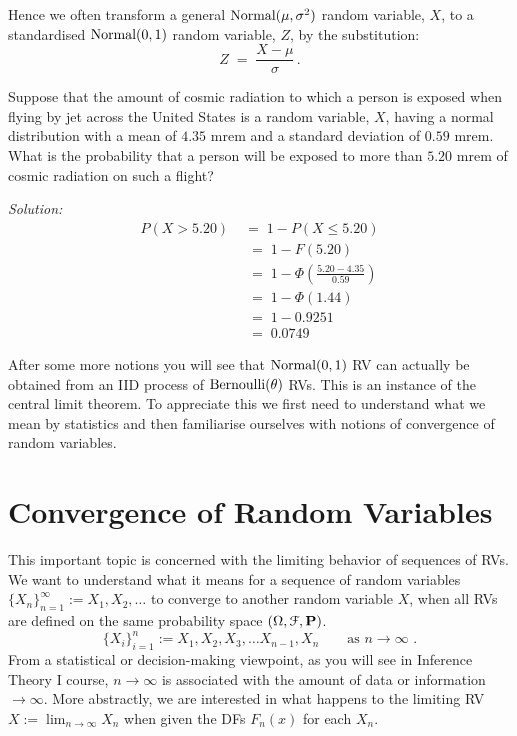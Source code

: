 Hence we often transform a general $\mbox{{\rm Normal}}(\mu,\sigma^2)$ random
variable, $X$, to a standardised $\mbox{{\rm Normal}}(0,1)$ random variable, $Z$, by
the substitution:
$$Z\;=\;\frac{X-\mu}{\sigma}\,.$$



\begin{example}
Suppose that the amount of cosmic radiation to which a person is exposed 
when flying by jet across the United States is a random
variable, $X$, having a normal distribution with a mean of $4.35$ mrem and a
standard deviation of $0.59$ mrem. What is the probability that a person
will be exposed to more than $5.20$ mrem of cosmic radiation on such a
flight?

{\em Solution:}
\begin{align*}
P(X> 5.20)\;&=\;1-P(X\leq
5.20)\\[3pt]&\;=\;1-F(5.20)\\[3pt]&\;=\;1-\Phi\left(\frac{5.20-4.35}{0.59}\right)\\[3pt]&\;=\;1-\Phi(1.44)\\[3pt]&\;=\;1-
0.9251\\[3pt]&\;=\;0.0749
\end{align*}
\end{example}

After some more notions you will see that $\mbox{{\rm Normal}}(0,1)$ RV can actually be obtained from an IID process of $\mbox{{\rm Bernoulli}}(\theta)$ RVs. This is an instance of the central limit theorem. To appreciate this we first need to understand what we mean by statistics and then familiarise ourselves with notions of convergence of random variables.

\section{Convergence of Random Variables}\label{S:ConvOfRVs}

This important topic is concerned with the limiting behavior of sequences of RVs. 
We want to understand what it means for a sequence of random variables $\{X_n\}_{n=1}^{\infty} := X_1,X_2,\ldots$ to converge to another random variable $X$, when all RVs are defined on the same probability space $(\Omega,\mathcal{F},\mathbf{P})$.
\[
\{X_i \}_{i=1}^n := X_1,X_2,X_3, \ldots X_{n-1}, X_n \qquad \text{as  $n \rightarrow \infty$ .}
\]
From a statistical or decision-making viewpoint, as you will see in Inference Theory I course, $n \rightarrow \infty$ is associated with the amount of data or information $\rightarrow \infty$.  
More abstractly, we are interested in what happens to the limiting RV $X := \lim_{n\to \infty} X_n$ when given the DFs $F_n(x)$ for each $X_n$. 

